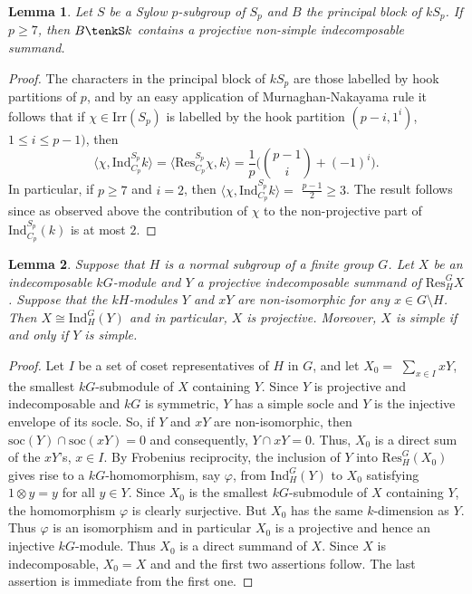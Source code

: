 \documentclass{amsart}
\theoremstyle{plain}\newtheorem{Theorem}{Theorem}[section]
\theoremstyle{plain}\newtheorem{Conjecture}[Theorem]{Conjecture}
\theoremstyle{plain}\newtheorem{Corollary}[Theorem]{Corollary}
\theoremstyle{plain}\newtheorem{Lemma}[Theorem]{Lemma}
\theoremstyle{plain}\newtheorem{Proposition}[Theorem]{Proposition}
\theoremstyle{definition}\newtheorem{Definition}[Theorem]{Definition}
\theoremstyle{definition}\newtheorem{Example}[Theorem]{Example}
\theoremstyle{definition}\newtheorem{Examples}[Theorem]{Examples}
\theoremstyle{definition}\newtheorem{Exercise}[Theorem]{Exercise}
\theoremstyle{definition}\newtheorem{Notation}[Theorem]{Notation}
\theoremstyle{definition}\newtheorem{Remark}[Theorem]{Remark}
\theoremstyle{definition}\newtheorem{Remarks}[Theorem]{Remarks}
\theoremstyle{plain}\newtheorem{Statement}[Theorem]{}
\def\Ind{\mathrm{Ind}}    \def\tenC{\otimes_C}
\def\Irr{\mathrm{Irr}}           \def\tenK{\otimes_K}
\def\Res{\mathrm{Res}}           \def\tenOR{\otimes_{\mathcal{O}R}}
\def\soc{\mathrm{soc}}           \def\tenOS{\otimes_{\mathcal{O}S}}
\begin{document}
\begin{Lemma}  \label{lem:proj non-simple}   
Let   $S$  be a Sylow $p$-subgroup of  $S_p$ and  $B$  the principal block of 
$kS_p$. If $p \geq 7$, then $B \tenkS k $ contains  a  projective  
non-simple indecomposable   summand.  
\end{Lemma}  

\begin{proof}  
The  characters in the  principal block  of $kS_p$ are those labelled by hook 
partitions of $p$, and   by an easy application of Murnaghan-Nakayama rule  
it follows that if $\chi  \in \Irr (S_p)$  is  labelled by   the hook partition   
$(p-i,  1^i )$, $ 1\leq  i \leq p-1) $, then 
$$\langle  \chi,  \Ind_{C_p} ^{S_p} k \rangle =  
\langle  \Res^{S_p}_{C_p}  \chi,  k  \rangle  = 
\frac{1}{p} \big( \binom{p-1}{i}  +(-1)^i \big) .$$
In particular, if $ p\geq 7 $ and $i=2$, then  
$\langle  \chi,  \Ind_{C_p} ^{S_p} k \rangle= $  $\frac{p-1}{2} \geq 3 $. 
 The result follows  since  as  observed above the  contribution of   $\chi $ to   
 the non-projective part of  $\Ind^{S_p}_{C_p}(k)$ is  at most $2$.
 \end{proof} 

\begin{Lemma} \label{lem:cliff} 
Suppose that $H$ is a normal subgroup of  a finite group $G$.
Let $X$ be an indecomposable  $kG$-module  and  $Y$ 
a projective  indecomposable   summand of $\Res^{G}_{H}  X$. Suppose that   
the  $kH$-modules    $Y $ and  $xY$   are non-isomorphic  for any 
$ x \in G\setminus  H$. Then   $ X \cong \Ind_H^G (Y)$  and in particular, 
$X$ is projective.   Moreover, $X$ is simple if and only if $Y$ is  simple.
\end{Lemma} 


\begin{proof} 
Let  $I$  be a set of coset representatives of $H$ in $G$, and let $X_0 =$
$\sum_{x\in I }  xY $, the smallest $kG$-submodule of $X$ containing $Y$.  Since  
 $Y$ is   projective  and indecomposable and $kG$ is symmetric,  $Y$ has a simple 
 socle  and  $Y$  is the  injective envelope of its  socle.  So,  if  $Y$ and $xY $ are 
 non-isomorphic, then   $\soc(Y) \cap \soc(xY)=0 $  and consequently, $Y \cap xY =0 $. 
 Thus,   $X_0$ is  a  direct sum of the $xY$'s,  $x\in I$.      By  Frobenius reciprocity, 
 the inclusion of $Y$ into $ \Res^{G}_{H}  (X_0)  $  gives  rise  to  a  $kG$-homomorphism, 
 say $\varphi$,    from $\Ind_H^G (Y) $  to $X_0$  satisfying    $ 1 \otimes y =  y  $ for 
 all   $ y\in Y$.   Since $X_0 $ is the smallest $kG$-submodule   of $X$ containing $Y$, 
 the homomorphism   $\varphi $  is clearly surjective.   But $X_0 $ has the same 
 $k$-dimension as  $Y$. Thus $\varphi $ is an isomorphism  and in particular $X_0$ 
 is  a projective and hence an  injective  $kG$-module. Thus $ X_0$ is a direct 
 summand of $X$. Since $X$ is indecomposable,  $X_0=X$ and 
and  the  first  two  assertions follow.  
The  last assertion is  immediate from the first one.
\end{proof}  
\end{document}
